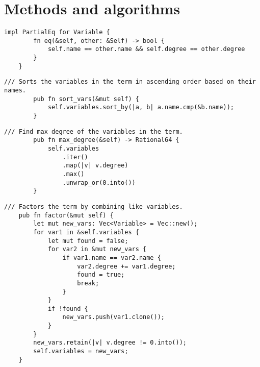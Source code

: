 \chapter{Methods and algorithms}\label{chap:appendix-a}

\begin{lstlisting}[caption={The implementation of \texttt{PartialEq} for the \texttt{Variable} struct}, label={lst:variable-eq}]
    impl PartialEq for Variable {
        fn eq(&self, other: &Self) -> bool {
            self.name == other.name && self.degree == other.degree
        }
    }
\end{lstlisting}

\begin{minipage}{\linewidth}
    \begin{lstlisting}[caption={The implementation of the \texttt{sort\_vars()} method for the \texttt{Term} struct}, label={lst:term-sort-vars}]
        /// Sorts the variables in the term in ascending order based on their names.
        pub fn sort_vars(&mut self) {
            self.variables.sort_by(|a, b| a.name.cmp(&b.name));
        }
    \end{lstlisting}
\end{minipage}

\begin{minipage}{\linewidth}
    \begin{lstlisting}[caption={The implementation of the \texttt{max\_degree()} method for the \texttt{Term} struct}, label={lst:term-max-degree}]
        /// Find max degree of the variables in the term.
        pub fn max_degree(&self) -> Rational64 {
            self.variables
                .iter()
                .map(|v| v.degree)
                .max()
                .unwrap_or(0.into())
        }
    \end{lstlisting}
\end{minipage}

\begin{lstlisting}[caption={The implementation of the \texttt{factor()} method for the \texttt{Term} struct}, label={lst:term-factor}]
    /// Factors the term by combining like variables.
    pub fn factor(&mut self) {
        let mut new_vars: Vec<Variable> = Vec::new();
        for var1 in &self.variables {
            let mut found = false;
            for var2 in &mut new_vars {
                if var1.name == var2.name {
                    var2.degree += var1.degree;
                    found = true;
                    break;
                }
            }
            if !found {
                new_vars.push(var1.clone());
            }
        }
        new_vars.retain(|v| v.degree != 0.into());
        self.variables = new_vars;
    }
\end{lstlisting}


